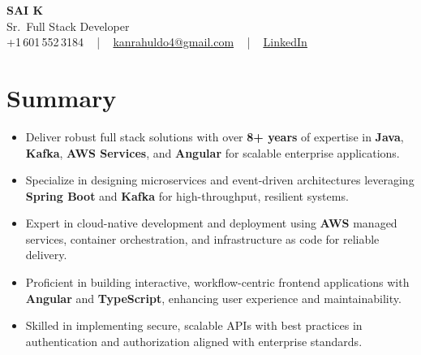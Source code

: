 \documentclass[letterpaper,11pt]{article}
\newcommand{\resumeItem}[1]{
  \item\footnotesize{
    {#1 \vspace{-2pt}}
  }
}
\newcommand{\resumeItemListStart}{\begin{itemize}[leftmargin=*]}
\newcommand{\resumeItemListEnd}{\end{itemize}\vspace{-5pt}}
\begin{document}
\begin{center}
    {\fontsize{14pt}{12pt}\selectfont \textbf{\MakeUppercase{Sai K}}}\\ \vspace{2pt}
    \fontsize{10pt}{12pt}\selectfont Sr.\ Full Stack Developer\\ \vspace{2pt}
    \fontsize{10pt}{12pt}\selectfont +1\,601\,552\,3184 ~ | ~
    \href{mailto:kanrahuldo4@gmail.com}{kanrahuldo4@gmail.com} ~ | ~
    \href{https://www.linkedin.com/in/srrrk/}{\color{blue}\underline{LinkedIn}}
    \vspace{-10pt}
\end{center}

\section{Summary}
\fontsize{9pt}{10pt}\selectfont
\resumeItemListStart
  \resumeItem{Deliver robust full stack solutions with over \textbf{8+ years} of expertise in \textbf{Java}, \textbf{Kafka}, \textbf{AWS Services}, and \textbf{Angular} for scalable enterprise applications.}
  \resumeItem{Specialize in designing microservices and event-driven architectures leveraging \textbf{Spring Boot} and \textbf{Kafka} for high-throughput, resilient systems.}
  \resumeItem{Expert in cloud-native development and deployment using \textbf{AWS} managed services, container orchestration, and infrastructure as code for reliable delivery.}
  \resumeItem{Proficient in building interactive, workflow-centric frontend applications with \textbf{Angular} and \textbf{TypeScript}, enhancing user experience and maintainability.}
  \resumeItem{Skilled in implementing secure, scalable APIs with best practices in authentication and authorization aligned with enterprise standards.}
\resumeItemListEnd
\vspace{-6pt}

\end{document}

